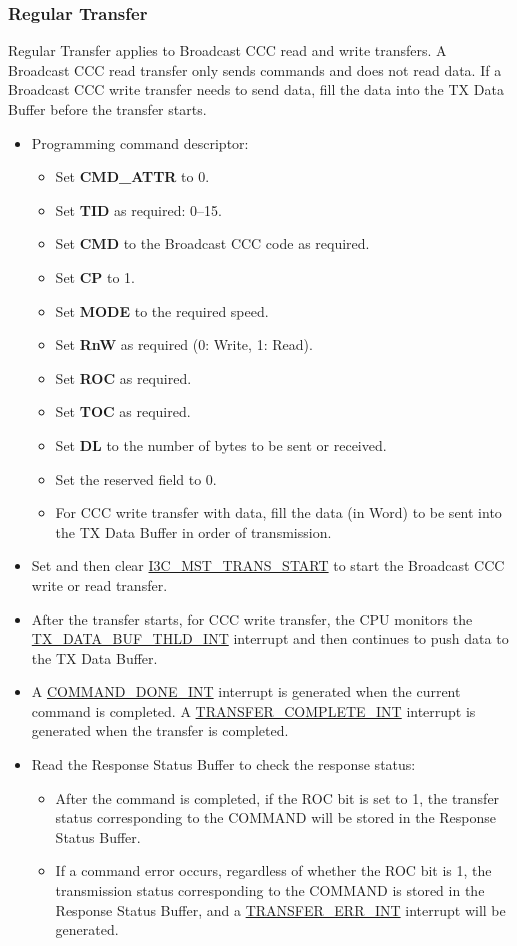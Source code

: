 \documentclass[main\_\_EN.tex]{subfiles}
\begin{document}
\subsubsection{Regular Transfer}
Regular Transfer applies to Broadcast CCC read and write transfers. A Broadcast CCC read transfer only sends commands and does not read data. If a Broadcast CCC write transfer needs to send data, fill the data into the TX Data Buffer before the transfer starts.

\begin{itemize}
    \item Programming command descriptor:
    \begin{itemize}
        \item Set \textbf{CMD\_ATTR} to 0.
        \item Set \textbf{TID} as required: 0–15.
        \item Set \textbf{CMD} to the Broadcast CCC code as required.
        \item Set \textbf{CP} to 1.
        \item Set \textbf{MODE} to the required speed.
        \item Set \textbf{RnW} as required (0: Write, 1: Read).
        \item Set \textbf{ROC} as required.
        \item Set \textbf{TOC} as required.
        \item Set \textbf{DL} to the number of bytes to be sent or received.
        \item Set the reserved field to 0.
        \item For CCC write transfer with data, fill the data (in Word) to be sent into the TX Data Buffer in order of transmission.
    \end{itemize}
    \item Set and then clear \hyperref[fielddesc:I3CMSTREGTRANSSTART]{I3C\_MST\_TRANS\_START} to start the Broadcast CCC write or read transfer.
    \item After the transfer starts, for CCC write transfer, the CPU monitors the \hyperref[int:TXDATABUFTHLDINT]{TX\_DATA\_BUF\_THLD\_INT} interrupt and then continues to push data to the TX Data Buffer.
    \item A \hyperref[int:COMMANDDONEINT]{COMMAND\_DONE\_INT} interrupt is generated when the current command is completed. A \hyperref[int:TRANSFERCOMPLETEINT]{TRANSFER\_COMPLETE\_INT} interrupt is generated when the transfer is completed.
    \item Read the Response Status Buffer to check the response status:
    \begin{itemize}
        \item After the command is completed, if the ROC bit is set to 1, the transfer status corresponding to the COMMAND will be stored in the Response Status Buffer.
        \item If a command error occurs, regardless of whether the ROC bit is 1, the transmission status corresponding to the COMMAND is stored in the Response Status Buffer, and a \hyperref[int:TRANSFERERRINT]{TRANSFER\_ERR\_INT} interrupt will be generated.
    \end{itemize}
\end{itemize}
\end{document}
